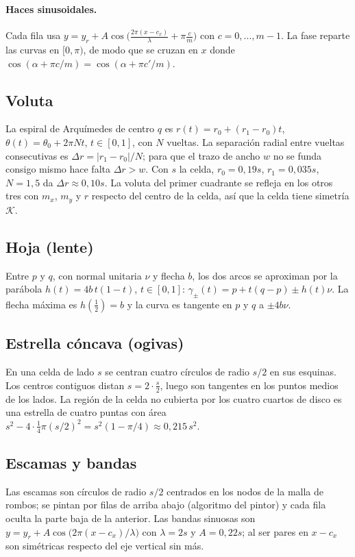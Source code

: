\documentclass[11pt,a4paper]{article}
\theoremstyle{definition}
\theoremstyle{plain}
\theoremstyle{remark}
\newcommand{\Klein}{\mathcal{K}}
\begin{document}
\paragraph{Haces sinusoidales.} Cada fila usa $y=y_r+A\cos\!\bigl(\tfrac{2\pi(x-c_x)}{\lambda}+\pi\tfrac{c}{m}\bigr)$
con $c=0,\dots,m-1$. La fase reparte las curvas en $[0,\pi)$, de modo que se
cruzan en $x$ donde $\cos(\alpha+\pi c/m)=\cos(\alpha+\pi c'/m)$.

\subsection{Voluta}
La espiral de Arquímedes de centro $q$ es $r(t)=r_0+(r_1-r_0)t$,
$\theta(t)=\theta_0+2\pi Nt$, $t\in[0,1]$, con $N$ vueltas. La separación
radial entre vueltas consecutivas es $\Delta r=|r_1-r_0|/N$; para que el trazo de
ancho $w$ no se funda consigo mismo hace falta $\Delta r>w$. Con $s$ la celda,
$r_0=0{,}19s$, $r_1=0{,}035s$, $N=1{,}5$ da $\Delta r\approx0{,}10s$.
La voluta del primer cuadrante se refleja en los otros tres con $m_x$, $m_y$
y $r$ respecto del centro de la celda, así que la celda tiene simetría $\Klein$.

\subsection{Hoja (lente)}
Entre $p$ y $q$, con normal unitaria $\nu$ y flecha $b$, los dos arcos se aproximan por
la parábola $h(t)=4b\,t(1-t)$, $t\in[0,1]$: $\gamma_\pm(t)=p+t(q-p)\pm h(t)\nu$.
La flecha máxima es $h(\tfrac12)=b$ y la curva es tangente en $p$ y $q$ a
$\pm4b\nu$.

\subsection{Estrella cóncava (ogivas)}
En una celda de lado $s$ se centran cuatro círculos de radio $s/2$ en sus
esquinas. Los centros contiguos distan $s=2\cdot\tfrac s2$, luego son tangentes en
los puntos medios de los lados. La región de la celda no cubierta por los cuatro
cuartos de disco es una estrella de cuatro puntas con área
$s^2-4\cdot\tfrac14\pi(s/2)^2=s^2(1-\pi/4)\approx0{,}215\,s^2$.

\subsection{Escamas y bandas}
Las escamas son círculos de radio $s/2$ centrados en los nodos de la malla de
rombos; se pintan por filas de arriba abajo (algoritmo del pintor) y cada fila
oculta la parte baja de la anterior. Las bandas sinuosas son
$y=y_r+A\cos\bigl(2\pi(x-c_x)/\lambda\bigr)$ con $\lambda=2s$ y $A=0{,}22s$; al ser
pares en $x-c_x$ son simétricas respecto del eje vertical sin más.
\end{document}
